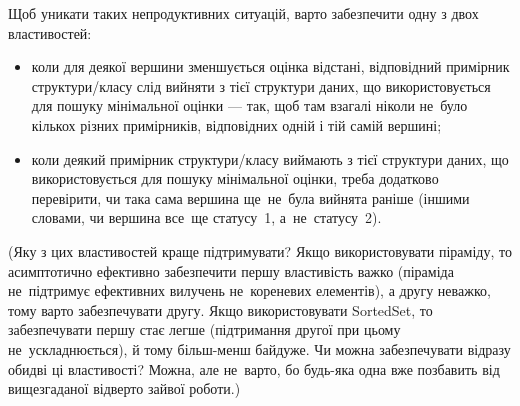 Щоб уникати таких непродуктивних ситуацій, варто забезпечити одну з двох властивостей:

\begin{itemize}
\item
коли для деякої вершини зменшується оцінка відстані, відповідний примірник структури/класу слід вийняти з тієї структури даних, що використовується для пошуку мінімальної оцінки --- так, щоб там взагалі ніколи не~було кількох різних примірників, відповідних одній і тій самій вершині;
\item
коли деякий примірник структури/класу виймають з тієї структури даних, що використовується для пошуку мінімальної оцінки, треба додатково перевірити, чи така сама вершина ще~не~була вийнята раніше (іншими словами, чи вершина все~ще статусу~1, а~не~статусу~2).
\end{itemize}

(Яку з цих властивостей краще підтримувати? Якщо використовувати піраміду, то асимптотично ефективно забезпечити першу властивість важко (піраміда не~підтримує ефективних вилучень не~кореневих елементів), а другу неважко, тому варто забезпечувати другу. Якщо використовувати SortedSet, то забезпечувати першу стає легше (підтримання другої при цьому не~ускладнюється), й тому більш-менш байдуже.
Чи можна забезпечувати відразу обидві ці властивості? Можна, але не~варто, бо будь-яка одна вже позбавить від вищезгаданої відверто зайвої роботи.)